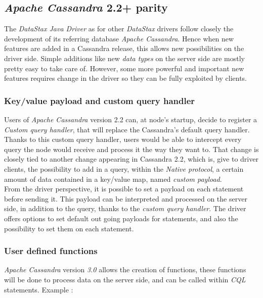 \documentclass[a4paper]{report}
\newcommand{\djd}{\emph{DataStax Java Driver\xspace}}
\newcommand{\ca}{\emph{Apache Cassandra\xspace}}
\begin{document}
\subsection{\ca{} 2.2+ parity}
The \djd{} as for other \emph{DataStax} drivers follow closely the development of its referring database \ca{}. Hence when new features are added in a Cassandra release, this allows new possibilities on the driver side. Simple additions like new \emph{data types} on the server side are mostly pretty easy to take care of. However, some more powerful and important new features requires change in the driver so they can be fully exploited by clients.

\subsubsection{Key/value payload and custom query handler}
Users of \ca{} version 2.2 can, at node's startup, decide to register a \emph{Custom query handler}, that will replace the Cassandra's default query handler. Thanks to this custom query handler, users would be able to intercept every query the node would receive and process it the way they want to. That change is closely tied to another change appearing in Cassandra 2.2, which is, give to driver clients, the possibility to add in a query, within the \emph{Native protocol}, a certain amount of data contained in a key/value map, named \emph{custom payload}.\\
From the driver perspective, it is possible to set a payload on each statement before sending it. This payload can be interpreted and processed on the server side, in addition to the query, thanks to the \emph{custom query handler}. The driver offers options to set default out going payloads for statements, and also the possibility to set them on each statement.

\subsubsection{User defined functions}
\ca{} version \emph{3.0} allows the creation of functions, these functions will be done to process data on the server side, and can be called within \emph{CQL} statements. Example : 
\end{document}
